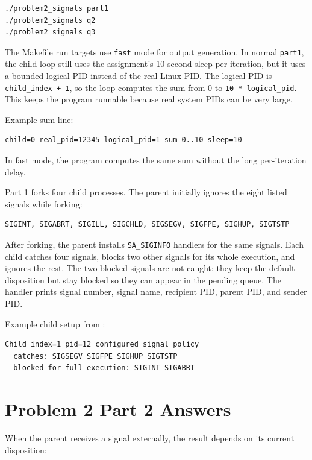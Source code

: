 \documentclass[11pt]{article}
\begin{document}
\begin{verbatim}
./problem2_signals part1
./problem2_signals q2
./problem2_signals q3
\end{verbatim}

The Makefile run targets use \texttt{fast} mode for output generation. In normal
\texttt{part1}, the child loop still uses the assignment's 10-second sleep per
iteration, but it uses a bounded logical PID instead of the real Linux PID. The
logical PID is \texttt{child\_index + 1}, so the loop computes the sum from 0 to
\texttt{10 * logical\_pid}. This keeps the program runnable because real system PIDs
can be very large.

Example sum line:

\begin{verbatim}
child=0 real_pid=12345 logical_pid=1 sum 0..10 sleep=10
\end{verbatim}

In fast mode, the program computes the same sum without the long per-iteration
delay.

Part 1 forks four child processes. The parent initially ignores the eight listed
signals while forking:

\begin{verbatim}
SIGINT, SIGABRT, SIGILL, SIGCHLD, SIGSEGV, SIGFPE, SIGHUP, SIGTSTP
\end{verbatim}

After forking, the parent installs \texttt{SA\_SIGINFO} handlers for the same signals.
Each child catches four signals, blocks two other signals for its whole execution,
and ignores the rest. The two blocked signals are not caught; they keep the default
disposition but stay blocked so they can appear in the pending queue. The handler
prints signal number, signal name, recipient PID, parent PID, and sender PID.

Example child setup from :

\begin{verbatim}
Child index=1 pid=12 configured signal policy
  catches: SIGSEGV SIGFPE SIGHUP SIGTSTP
  blocked for full execution: SIGINT SIGABRT
\end{verbatim}

\section{Problem 2 Part 2 Answers}

When the parent receives a signal externally, the result depends on its current
disposition:
\end{document}
